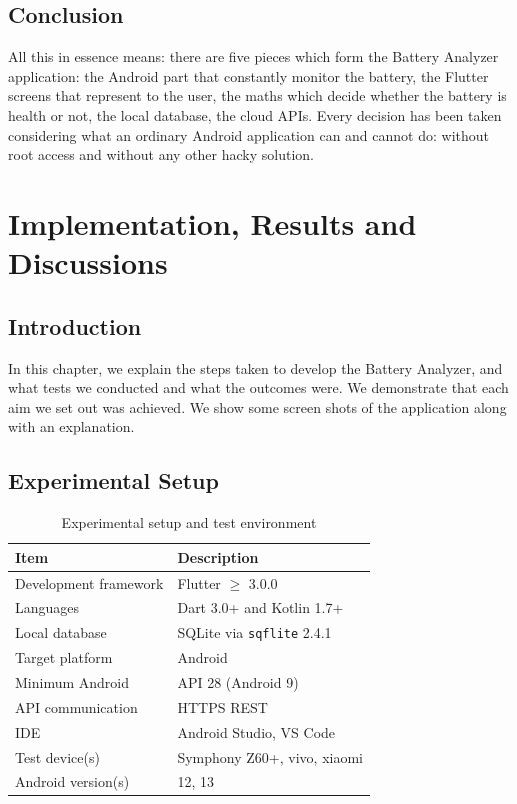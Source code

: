 \documentclass[12pt,a4paper]{report}
\begin{document}
\section{Conclusion}
All this in essence means: there are five pieces which form the Battery Analyzer application: the Android part that constantly monitor the battery, the Flutter screens that represent to the user, the maths which decide whether the battery is health or not, the local database, the cloud APIs. Every decision has been taken considering what an ordinary Android application can and cannot do: without root access and without any other hacky solution.

\chapter{Implementation, Results and Discussions}

\section{Introduction}
In this chapter, we explain the steps taken to develop the Battery Analyzer, and what tests we conducted and what the outcomes were. We demonstrate that each aim we set out was achieved. We show some screen shots of the application along with an explanation.

\section{Experimental Setup}

\begin{table}[H]
\caption{Experimental setup and test environment}
\centering
\small
\begin{tabular}{ll}
\toprule
\textbf{Item} & \textbf{Description}\\
\midrule
Development framework  & Flutter $\geq$ 3.0.0\\
Languages              & Dart 3.0+ and Kotlin 1.7+\\
Local database         & SQLite via \texttt{sqflite} 2.4.1\\
Target platform        & Android\\
Minimum Android        & API 28 (Android 9)\\
API communication      & HTTPS REST\\
IDE                    & Android Studio, VS Code\\
Test device(s)         & Symphony Z60+, vivo, xiaomi\\
Android version(s)     & 12, 13\\
\bottomrule
\end{tabular}
\end{table}
\end{document}
